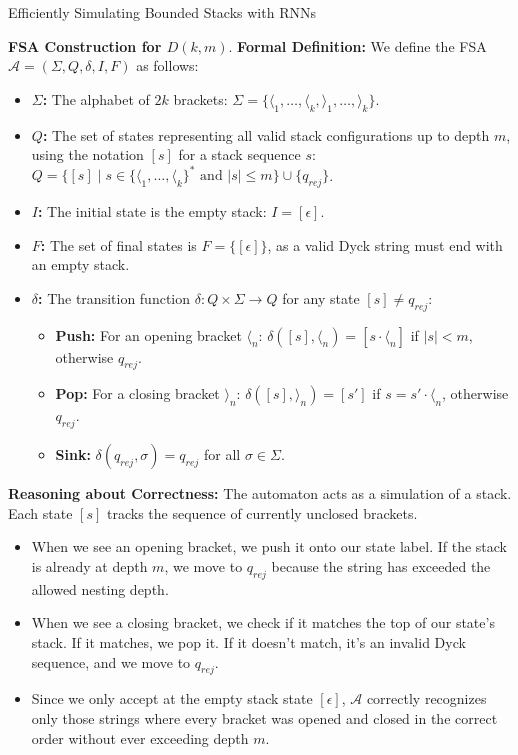 \begin{question}{Efficiently Simulating Bounded Stacks with RNNs}
\begin{subquestion}{\textbf{FSA Construction for $D(k,m)$}.}
\textbf{Formal Definition:}
We define the FSA $\mathcal{A} = (\Sigma, Q, \delta, I, F)$ as follows:
\begin{itemize}
    \item \textbf{$\Sigma$:} The alphabet of $2k$ brackets: $\Sigma = \{ \langle_1, \dots, \langle_k, \rangle_1, \dots, \rangle_k \}$.
    \item \textbf{$Q$:} The set of states representing all valid stack configurations up to depth $m$, using the notation $[s]$ for a stack sequence $s$:
    $Q = \{ [s] \mid s \in \{ \langle_1, \dots, \langle_k \}^* \text{ and } |s| \le m \} \cup \{ q_{rej} \}$.
    \item \textbf{$I$:} The initial state is the empty stack: $I = [\epsilon]$.
    \item \textbf{$F$:} The set of final states is $F = \{ [\epsilon] \}$, as a valid Dyck string must end with an empty stack.
    \item \textbf{$\delta$:} The transition function $\delta: Q \times \Sigma \to Q$ for any state $[s] \neq q_{rej}$:
    \begin{itemize}
        \item \textbf{Push:} For an opening bracket $\langle_n$: $\delta([s], \langle_n) = [s \cdot \langle_n]$ if $|s| < m$, otherwise $q_{rej}$.
        \item \textbf{Pop:} For a closing bracket $\rangle_n$: $\delta([s], \rangle_n) = [s']$ if $s = s' \cdot \langle_n$, otherwise $q_{rej}$.
        \item \textbf{Sink:} $\delta(q_{rej}, \sigma) = q_{rej}$ for all $\sigma \in \Sigma$.
    \end{itemize}
\end{itemize}

\textbf{Reasoning about Correctness:}
The automaton acts as a simulation of a stack. Each state $[s]$ tracks the sequence of currently unclosed brackets. 
\begin{itemize}
    \item When we see an opening bracket, we push it onto our state label. If the stack is already at depth $m$, we move to $q_{rej}$ because the string has exceeded the allowed nesting depth.
    \item When we see a closing bracket, we check if it matches the top of our state's stack. If it matches, we pop it. If it doesn't match, it's an invalid Dyck sequence, and we move to $q_{rej}$.
    \item Since we only accept at the empty stack state $[\epsilon]$, $\mathcal{A}$ correctly recognizes only those strings where every bracket was opened and closed in the correct order without ever exceeding depth $m$.
\end{itemize}


\end{subquestion}
\end{question}
